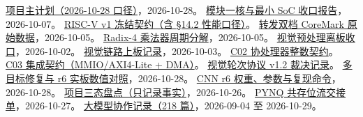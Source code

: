 \documentclass[UTF8,a4paper,zihao=-4,fontset=fandol]{ctexart}
\newcommand{\sourcepath}[2]{\href{https://github.com/never-die-cold/FPGA-Alittle-Design/blob/a631fd2/#1}{#2}}
\begin{document}
\begin{thebibliography}{9}
\sourcepath{plan.md}{项目主计划（2026-10-28 口径）}，2026-10-28。
\sourcepath{report/module1-closure.md}{模块一核与最小 SoC 收口报告}，2026-10-07。
\sourcepath{src/riscv/design_v1.md}{RISC-V v1 冻结契约（含 \S 14.2 性能口径）}。
\sourcepath{data/logs/2026-10-05-partB-v1-coremark-cpi/}{转发双档 CoreMark 原始数据}，2026-10-05。
\sourcepath{data/logs/2026-10-05-partB-radix4-cycle-breakdown/}{Radix-4 乘法器周期分解}，2026-10-05。
\sourcepath{data/logs/2026-10-02-vision-offboard/}{视觉预处理离板收口}，2026-10-02。
\sourcepath{data/logs/2026-10-03-vision-onboard/}{视觉链路上板记录}，2026-10-03。
\sourcepath{src/coprocessor/design_v0.md}{C02 协处理器整数契约}。
\sourcepath{docs/contracts/coprocessor-integration-v0.md}{C03 集成契约（MMIO/AXI4-Lite + DMA）}。
\sourcepath{docs/contracts/vision-sync-protocol-decisions.md}{视觉轮次协议 v1.2 裁决记录}。
\sourcepath{data/logs/2026-10-28-multitarget-board-r6/}{多目标修复与 r6 实板数值对照}，2026-10-28。
\sourcepath{data/evidence/2026-10-28-cnn-r6/}{CNN r6 权重、参数与复现命令}，2026-10-28。
\sourcepath{report/project-final-status-2026-10-26.md}{项目三态盘点（只记录事实）}，2026-10-26。
\sourcepath{docs/runbooks/pynq-coexist-handoff-2026-10-27.md}{PYNQ 共存位流交接单}，2026-10-27。
\sourcepath{report/llm_log/}{大模型协作记录（218 篇）}，2026-09-04 至 2026-10-29。
\end{thebibliography}
\end{document}
